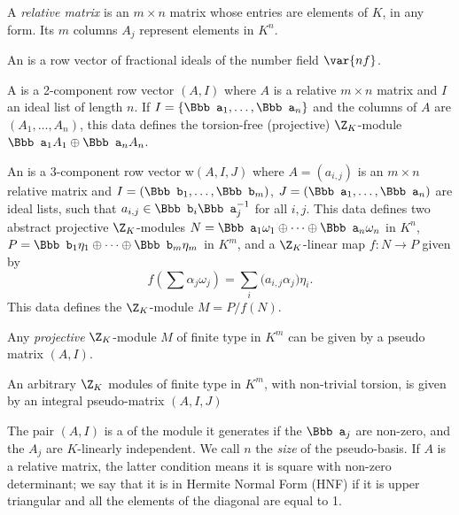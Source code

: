 \item A \emph{relative matrix} is an $m\times n$ matrix whose entries are
elements of $K$, in any form. Its $m$ columns $A_j$ represent elements
in $K^n$.

\item An  is a row vector of fractional ideals of the number
field $\var{nf}$.

\item A  is a 2-component row vector $(A,I)$ where $A$
is a relative $m\times n$ matrix and $I$ an ideal list of length $n$. If $I =
\{{\Bbb a}_1,\dots, {\Bbb a}_n\}$ and the columns of $A$ are $(A_1,\dots,
A_n)$, this data defines the torsion-free (projective) $\Z_K$-module ${\Bbb
a}_1 A_1\oplus {\Bbb a}_n A_n$.

\item An  is a 3-component row vector w$(A,I,J)$
where $A = (a_{i,j})$ is an $m\times n$ relative matrix and $I = ({\Bbb
b}_1,\dots, {\Bbb b}_m)$, $J = ({\Bbb a}_1,\dots, {\Bbb a}_n)$ are ideal
lists, such that $a_{i,j} \in {\Bbb b}_i {\Bbb a}_j^{-1}$ for all $i,j$. This
data defines two abstract projective $\Z_K$-modules $N = {\Bbb
a_1}\omega_1\oplus \cdots\oplus {\Bbb a_n}\omega_n $ in $K^n$, $P = {\Bbb
b_1}\eta_1\oplus \cdots\oplus {\Bbb b_m}\eta_m$ in $K^m$, and a $\Z_K$-linear
map $f:N\to P$ given by
$$ f(\sum \alpha_j\omega_j) = \sum_i \Big(a_{i,j}\alpha_j\Big) \eta_i.$$
This data defines the $\Z_K$-module $M = P/f(N)$.

\item Any \emph{projective} $\Z_K$-module $M$
of finite type in $K^m$ can be given by a pseudo matrix $(A,I)$.

\item An arbitrary $\Z_K$ modules of finite type in $K^m$, with non-trivial
torsion, is given by an integral pseudo-matrix $(A,I,J)$


\item The pair $(A,I)$ is a  of the module it
generates if the ${\Bbb a_j}$ are non-zero, and the $A_j$ are $K$-linearly
independent. We call $n$ the \emph{size} of the pseudo-basis. If $A$ is a
relative matrix, the latter condition means it is square with non-zero
determinant; we say that it is in Hermite Normal Form (HNF) if it is upper triangular and all the elements of the diagonal
are equal to 1.

